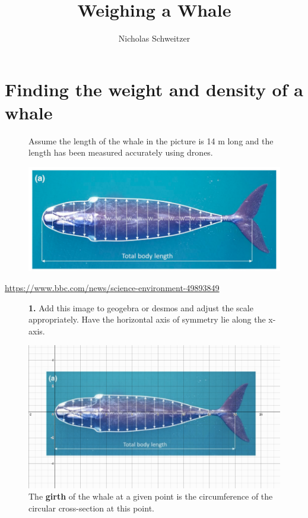 \documentclass[fleqn]{article}
\title{\Huge Weighing a Whale}
\author{Nicholas Schweitzer}
\date{}
\begin{document}
\maketitle

\section{Finding the weight and density of a whale}

\begin{figure}[H]
  Assume the length of the whale in the picture is 14 m long and the length has been measured accurately using drones.

  \includegraphics{whale_with_distances.png}
\end{figure}

\href{https://www.bbc.com/news/science-environment-49893849}{https://www.bbc.com/news/science-environment-49893849}

\begin{figure}[H]
  \textbf{1.} Add this image to geogebra or desmos and adjust the scale appropriately. Have the horizontal axis of symmetry lie along the x-axis.

  \includegraphics[scale=0.4]{desmos-whale.png}
  The \textbf{girth} of the whale at a given point is the circumference of the circular cross-section at this point.
\end{figure}
\end{document}
